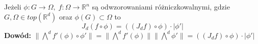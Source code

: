 \begin{lem}
	Jeżeli $\phi: G \rightarrow \Omega, \; f: \Omega \rightarrow \mathbb{R}^n$ są odwzorowaniami różniczkowalnymi, gdzie $G, \Omega \in top(\mathbb{R}^d)$ oraz $\phi(G) \subset \Omega$ to $$
		J_d (f \circ \phi) = ((J_df) \circ \phi) \cdot |\phi'| 
	$$
	\textbf{Dowód:}\newline
	$\| \bigwedge^d f'(\phi) \circ \phi' \| = \| \bigwedge^d f'(\phi) \| \| \bigwedge^d \phi' \| = ((J_df) \circ \phi) \cdot |\phi'|$    
\end{lem}